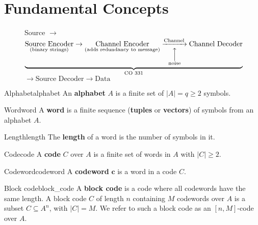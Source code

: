 \section{Fundamental Concepts}

\begin{figure}[h]
    \centering
    Source
    $ \rightarrow $
    $ \underbrace{
            \underset{\text{(binary strings)}}{\text{Source Encoder}}
            \rightarrow
            \underset{\text{(adds redundancy to message)}}{\text{Channel Encoder}}
            \underset{\overset{\Big\uparrow}{\text{noise}}}{\xrightarrow{\text{Channel}}}
            \text{Channel Decoder}}_{\text{CO 331}}$
    $ \rightarrow \text{Source Decoder} \rightarrow \text{Data} $
\end{figure}

\begin{Definition}{Alphabet}{alphabet}
    An \textbf{alphabet} $ A $ is a finite set of $ |A|= q\geqslant 2 $ symbols.
\end{Definition}

\begin{Definition}{Word}{word}
    A \textbf{word} is a finite sequence (\textbf{tuples} or \textbf{vectors})
    of symbols from an alphabet $ A $.
\end{Definition}

\begin{Definition}{Length}{length}
    The \textbf{length} of a word is the number of symbols in it.
\end{Definition}

\begin{Definition}{Code}{code}
    A \textbf{code} $ C $ over $ A $ is a finite set of words in $ A $
    with $ |C|\geqslant 2 $.
\end{Definition}

\begin{Definition}{Codeword}{codeword}
    A \textbf{codeword} $ \bm{c} $ is a word in a code $ C $.
\end{Definition}

\begin{Definition}{Block code}{block_code}
    A \textbf{block code} is a code where all codewords have the same length.
    A block code $ C $ of length $ n $ containing $ M $ codewords over $ A $
    is a subset $ C\subseteq A^n $, with $ |C|=M $. We refer to such a block
    code as an $ [n,M] $-code over $ A $.
\end{Definition}

